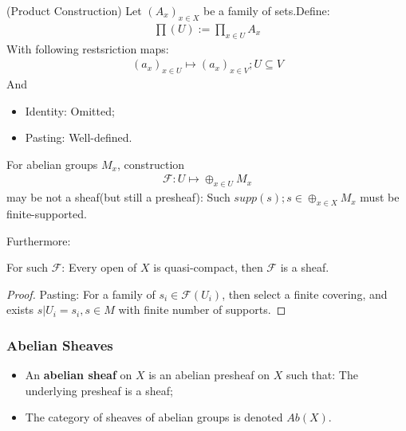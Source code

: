 \documentclass[Total.tex]{subfiles}
\begin{document}
				\begin{example}
					(Product Construction) Let $(A_x)_{x\in X}$ be a family of sets.Define:
					\begin{gather*}
						\prod(U):=\prod_{x\in U} A_x
					\end{gather*}
					With following restsriction maps:
					\begin{gather*}
						(a_x)_{x\in U}\mapsto (a_x)_{x\in V};U\subseteq V
					\end{gather*}
					And
					\begin{itemize}
						\item Identity: Omitted;
						\item Pasting: Well-defined.
					\end{itemize}
				\end{example}
				
				\begin{example}
					For abelian groups $M_x$, construction
					\begin{gather*}
						\mathcal{F}:U\mapsto \oplus_{x\in U} M_x
					\end{gather*}
					may be not a sheaf(but still a presheaf): Such $supp(s);s\in \oplus_{x\in X} M_x$ must be finite-supported. 
				\end{example}
				
				Furthermore:
				\begin{proposition}
					For such $\mathcal{F}$: Every open of $X$ is quasi-compact, then $\mathcal{F}$ is a sheaf.
				\end{proposition}
				\begin{proof}
					Pasting: For a family of $s_i\in \mathcal{F}(U_i)$, then select a finite covering, and exists $s|U_i=s_i,s\in M$ with finite number of supports.
				\end{proof}
				
				\subsubsection{Abelian Sheaves}
				
				\begin{Def}
					\begin{itemize}
						\item An \textbf{abelian sheaf} on $X$ is an abelian presheaf on $X$ such that: The underlying presheaf is a sheaf;
						\item The category of sheaves of abelian groups is denoted $Ab(X)$.
					\end{itemize}
				\end{Def}
				
\end{document}
